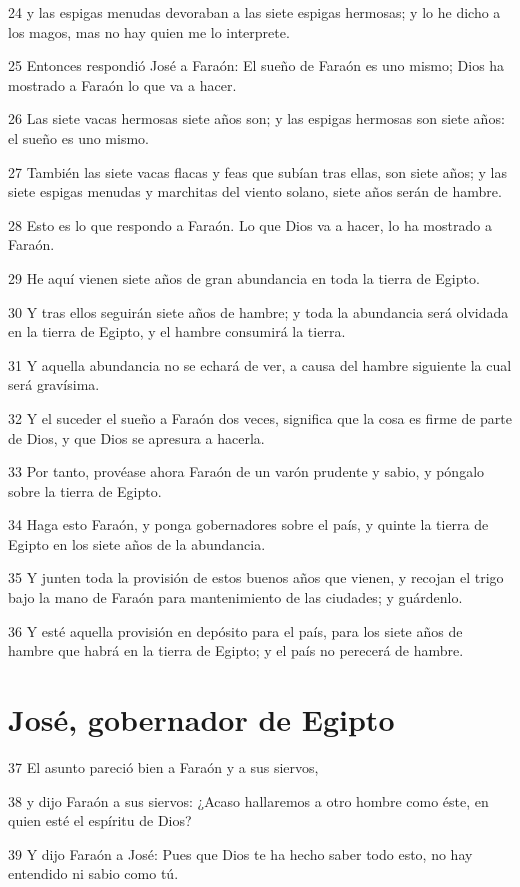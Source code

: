 24 y las espigas menudas devoraban a las siete espigas hermosas; y lo he dicho a los magos, mas no hay quien me lo interprete.

25 Entonces respondió José a Faraón: El sueño de Faraón es uno mismo; Dios ha mostrado a Faraón lo que va a hacer.

26 Las siete vacas hermosas siete años son; y las espigas hermosas son siete años: el sueño es uno mismo.

27 También las siete vacas flacas y feas que subían tras ellas, son siete años; y las siete espigas menudas y marchitas del viento solano, siete años serán de hambre.

28 Esto es lo que respondo a Faraón. Lo que Dios va a hacer, lo ha mostrado a Faraón.

29 He aquí vienen siete años de gran abundancia en toda la tierra de Egipto.

30 Y tras ellos seguirán siete años de hambre; y toda la abundancia será olvidada en la tierra de Egipto, y el hambre consumirá la tierra.

31 Y aquella abundancia no se echará de ver, a causa del hambre siguiente la cual será gravísima.

32 Y el suceder el sueño a Faraón dos veces, significa que la cosa es firme de parte de Dios, y que Dios se apresura a hacerla.

33 Por tanto, provéase ahora Faraón de un varón prudente y sabio, y póngalo sobre la tierra de Egipto.

34 Haga esto Faraón, y ponga gobernadores sobre el país, y quinte la tierra de Egipto en los siete años de la abundancia.

35 Y junten toda la provisión de estos buenos años que vienen, y recojan el trigo bajo la mano de Faraón para mantenimiento de las ciudades; y guárdenlo.

36 Y esté aquella provisión en depósito para el país, para los siete años de hambre que habrá en la tierra de Egipto; y el país no perecerá de hambre.

\section{José, gobernador de Egipto}

37 El asunto pareció bien a Faraón y a sus siervos,

38 y dijo Faraón a sus siervos: ¿Acaso hallaremos a otro hombre como éste, en quien esté el espíritu de Dios?

39 Y dijo Faraón a José: Pues que Dios te ha hecho saber todo esto, no hay entendido ni sabio como tú.


